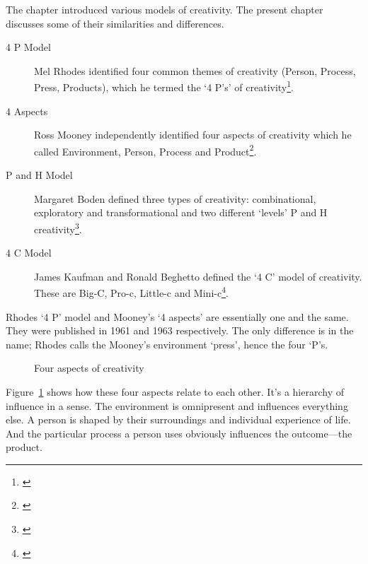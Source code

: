 The  chapter introduced various models of creativity. The present chapter discusses some of their similarities and differences.

\begin{description}
  \item [4 P Model] Mel Rhodes identified four common themes of creativity (Person, Process, Press, Products), which he termed the `4 P\rq s' of creativity\footnote{\autocite{Rhodes1961}}.
  \item [4 Aspects] Ross Mooney independently identified four aspects of creativity which he called Environment, Person, Process and Product\footnote{\autocite[as cited in][]{Sternberg1999}}.
  \item [P and H Model] Margaret Boden defined three types of creativity: combinational, exploratory and transformational and two different `levels' P and H creativity\footnote{\autocite{Boden2003}}.
  \item [4 C Model] James Kaufman and Ronald Beghetto defined the `4 C' model of creativity. These are Big-C, Pro-c, Little-c and Mini-c\footnote{\autocite{Kaufman2009}}.
\end{description}

Rhodes `4 P' model and Mooney's `4 aspects' are essentially one and the same. They were published in 1961 and 1963 respectively. The only difference is in the name; Rhodes calls the Mooney's environment `press', hence the four `P's.

\begin{figure}[!htbp] %
  \centering
\caption[Four aspects of creativity]{Four aspects of creativity}
\label{fig:4Crea}
\end{figure}

Figure~\ref{fig:4Crea} shows how these four aspects relate to each other. It's a hierarchy of influence in a sense. The environment is omnipresent and influences everything else. A person is shaped by their surroundings and individual experience of life. And the particular process a person uses obviously influences the outcome---the product.


